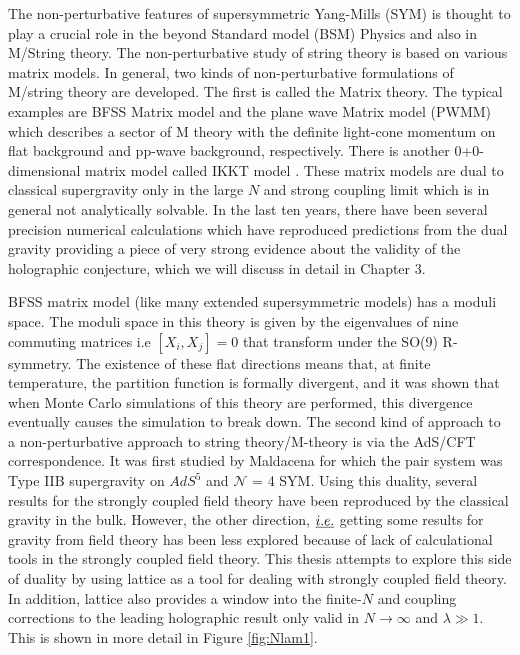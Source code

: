 The non-perturbative features of supersymmetric Yang-Mills (SYM) is thought to play a crucial role in the beyond 
Standard model (BSM) Physics and also in M/String theory. 
The non-perturbative study of string theory is based on various matrix models. 
In general, two kinds of non-perturbative formulations of M/string theory are developed. The first is called the Matrix theory. 
The typical examples are BFSS Matrix model and the
plane wave Matrix model (PWMM) which describes a sector
of M theory with the definite light-cone momentum on flat
background and pp-wave background, respectively. There is another 
0+0-dimensional matrix model called IKKT model \cite{Ishibashi:1996xs}. 
These matrix models are dual to classical supergravity only in the large $N$ and strong coupling limit which 
is in general not analytically solvable. In the last ten years, there have been several precision numerical calculations 
which have reproduced predictions from the dual gravity providing a piece of very strong evidence about the validity of 
the holographic conjecture, which we will discuss in detail in Chapter 3. 

BFSS matrix model (like many extended supersymmetric models) has a moduli space. 
The moduli space in this theory is given by the eigenvalues of nine commuting matrices i.e $ [X_{i}, X_{j}] = 0 $ 
that transform under the SO(9) R-symmetry. The existence of these flat directions means that, at finite temperature,
the partition function is formally divergent, and it was shown that when Monte
Carlo simulations of this theory are performed, this divergence eventually causes the
simulation to break down. The second kind of approach to a non-perturbative approach to string theory/M-theory 
is via the AdS/CFT correspondence. It was first studied by Maldacena for which the pair system was 
Type IIB supergravity on $AdS^{5}$ and $\mathcal{N}$ = 4 SYM. 
Using this duality, several results for the strongly coupled field theory have been reproduced by the classical 
gravity in the bulk. However, the other direction, $\emph{i.e.}$
getting some results for gravity from field theory has been less explored because of lack of calculational tools in 
the strongly coupled field theory. This thesis attempts to explore this side of duality by using lattice as a tool for 
dealing with strongly coupled field theory. 
In addition, lattice also provides a window into the finite-$N$ and coupling corrections to the leading holographic 
result only valid in $N \to \infty$ and $\lambda \gg 1$. This is shown in more detail in Figure \ref{fig:Nlam1}. 


